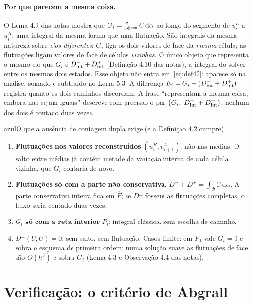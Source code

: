 \documentclass[11pt,a4paper]{article}
\theoremstyle{definition}
\theoremstyle{remark}
\newcommand{\dd}{\mathrm{d}}
\newcommand{\Fh}{\widehat F}
\begin{document}
\paragraph{Por que parecem a mesma coisa.} O Lema 4.9 das notas mostra que $G_i=\int_{\Phi^{\rm seg}}C\,\dd\alpha$ ao longo do segmento de $u_i^L$ a $u_i^R$: uma integral da mesma forma que uma flutuação. São integrais da mesma natureza sobre \emph{elos diferentes}: $G_i$ liga os dois valores de face da \emph{mesma} célula; as flutuações ligam valores de face de células \emph{vizinhas}. O único objeto que representa o mesmo elo que $G_i$ é $D^-_{\rm int}+D^+_{\rm int}$ (Definição 4.10 das notas), a integral do solver entre os mesmos dois estados. Esse objeto não entra em~\eqref{eq:def42}: aparece só na análise, somado e subtraído no Lema 5.3. A diferença $E_i=G_i-(D^-_{\rm int}+D^+_{\rm int})$ registra quanto os dois caminhos discordam. A frase ``representam a mesma coisa, embora não sejam iguais'' descreve com precisão o par $\big(G_i,\ D^-_{\rm int}+D^+_{\rm int}\big)$; nenhum dos dois é contado duas vezes.

\begin{quadro}{azul}{O que a ausência de contagem dupla exige (e a Definição 4.2 cumpre)}
\begin{enumerate}[label=(\alph*),leftmargin=*]
\item \textbf{Flutuações nos valores reconstruídos} $(u_i^R,u_{i+1}^L)$, não nas médias. O salto entre médias já contém metade da variação interna de cada célula vizinha, que $G_i$ contaria de novo.
\item \textbf{Flutuações só com a parte não conservativa}, $D^-+D^+=\int_\Phi C\,\dd\alpha$. A parte conservativa inteira fica em $\Fh$; se $D^\pm$ fossem as flutuações completas, o fluxo seria contado duas vezes.
\item \textbf{$G_i$ só com a reta interior} $P_i$: integral clássica, sem escolha de caminho.
\item \textbf{$D^\pm(U,U)=0$}: sem salto, sem flutuação. Casos-limite: em $P_0$ vale $G_i=0$ e sobra o esquema de primeira ordem; numa solução suave as flutuações de face são $O(h^3)$ e sobra $G_i$ (Lema 4.3 e Observação 4.4 das notas).
\end{enumerate}
\end{quadro}

\section{Verificação: o critério de Abgrall}
\end{document}
